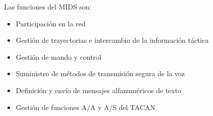 Las funciones del MIDS son:

\begin{itemize}
\item Participaci\'on en la red
\item Gestión de trayectorias e intercambio de la informaci\'on t\'actica
\item Gesti\'on de mando y control
\item Suministro de m\'etodos de transmisi\'on segura de la voz
\item Definici\'on y env\'io de mensajes alfanum\'ericos de texto
\item Gesti\'on de funciones \ac{A/A} y \ac{A/S} del \ac{TACAN}
\end{itemize}













